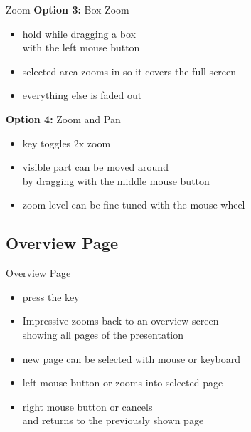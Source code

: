 \documentclass[bigger,hyperref={colorlinks=true,linkcolor=white,urlcolor=blue}]{beamer}
\begin{document}
\begin{frame}{Zoom}
    \textbf{Option 3:} Box Zoom
    \begin{itemize}
        \item hold  while dragging a box \\
              with the left mouse button
        \item selected area zooms in so it covers the full screen
        \item everything else is faded out
    \end{itemize}
    \vspace{0.5cm}
    \textbf{Option 4:} Zoom and Pan
    \begin{itemize}
        \item {} key toggles 2x zoom
        \item visible part can be moved around \\
              by dragging with the middle mouse button
        \item zoom level can be fine-tuned with the mouse wheel
    \end{itemize}
\end{frame}

\subsection{Overview Page}
\begin{frame}{Overview Page}
    \begin{itemize}
        \item press the  key
        \item Impressive zooms back to an overview screen \\
              showing all pages of the presentation
        \item new page can be selected with mouse or keyboard
        \item left mouse button or \Enter zooms into selected page
        \item right mouse button or  cancels \\
              and returns to the previously shown page
    \end{itemize}
\end{frame}
\end{document}
